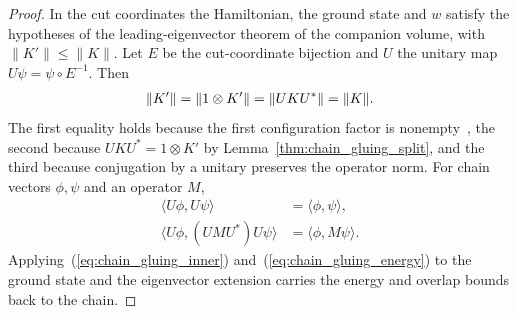 \begin{proof}
    \leanok
    In the cut coordinates the Hamiltonian, the ground state and $w$ satisfy
    the hypotheses of the leading-eigenvector theorem of the companion volume,
    with $\lVert K'\rVert\le\lVert K\rVert$. Let $E$ be the cut-coordinate
    bijection and $U$ the unitary map $U\psi=\psi\circ E^{-1}$. Then
    \begin{align}
        \lVert K'\rVert=\lVert1\otimes K'\rVert=\lVert UKU^*\rVert
        =\lVert K\rVert.\notag
    \end{align}
    The first equality holds because the first configuration factor is
    nonempty~\cite[``Operator norm after adjoining an identity factor'']{QICLean2026Blueprint},
    the second because $UKU^*=1\otimes K'$
    by Lemma~\ref{thm:chain_gluing_split}, and the third because
    conjugation by a unitary preserves the operator norm. For chain vectors
    $\phi,\psi$ and an operator $M$,
    \begin{align}
        \langle U\phi,U\psi\rangle
         & =\langle\phi,\psi\rangle,
        \label{eq:chain_gluing_inner} \\
        \langle U\phi,(UMU^*)U\psi\rangle
         & =\langle\phi,M\psi\rangle.
        \label{eq:chain_gluing_energy}
    \end{align}
    Applying~(\ref{eq:chain_gluing_inner}) and~(\ref{eq:chain_gluing_energy})
    to the ground state and the eigenvector
    extension carries the energy and overlap bounds back to the chain.
\end{proof}


